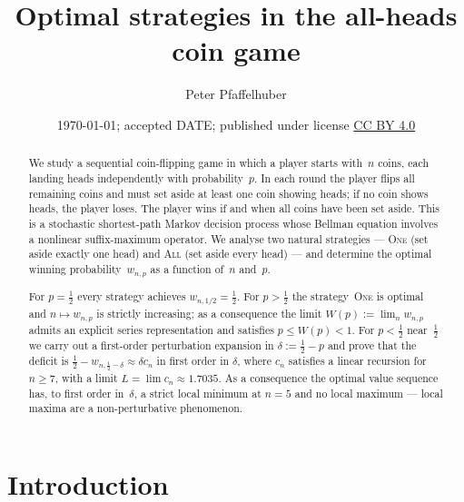\documentclass[reqno,final,11pt]{amsart}
\date{\today; accepted DATE; published under license
\href{https://creativecommons.org/licenses/by/4.0/}{\textup{CC BY 4.0}}}
\theoremstyle{plain}
\theoremstyle{definition}
\theoremstyle{remark}
\newcommand{\One}{\textsc{One}}
\newcommand{\All}{\textsc{All}}
\begin{document}
\title[Optimal strategies in the all-heads coin game]%
      {Optimal strategies in the all-heads coin game}

\author{Peter Pfaffelhuber}
\address{Albert-Ludwigs-Universit\"at Freiburg,
  Ernst-Zermelo-Str.~1, 79104 Freiburg, Germany}


\begin{abstract}
  We study a sequential coin-flipping game in which a player starts
  with~$n$ coins, each landing heads independently with
  probability~$p$.  In each round the player flips all remaining coins
  and must set aside at least one coin showing heads; if no coin shows
  heads, the player loses.  The player wins if and when all coins have
  been set aside.  This is a stochastic shortest-path Markov decision
  process whose Bellman equation involves a nonlinear suffix-maximum
  operator.  We analyse two natural strategies --- \One{} (set aside
  exactly one head) and \All{} (set aside every head) --- and
  determine the optimal winning probability~$w_{n,p}$ as a function
  of~$n$ and~$p$.

  For $p=\tfrac12$ every strategy
  achieves $w_{n,1/2}=\tfrac12$.  For $p>\tfrac12$ the
  strategy~\One{} is optimal and $n\mapsto w_{n,p}$ is strictly
  increasing; as a consequence the limit $W(p):=\lim_n w_{n,p}$
  admits an explicit series representation and satisfies
  $p\le W(p)<1$.  For $p<\tfrac12$ near~$\tfrac12$ we carry out a
  first-order perturbation expansion in $\delta:=\tfrac12-p$ and prove
  that the deficit is 
  $\tfrac12-w_{n,\tfrac 12 - \delta} \approx \delta c_n$ in first order in $\delta$, 
  where $c_n$ satisfies a linear recursion for $n\ge 7$, with
  a limit $L=\lim c_n\approx 1.7035$.  As a consequence the optimal
  value sequence has, to first order in~$\delta$, a strict local
  minimum at $n=5$ and no local maximum --- local maxima are a
  non-perturbative phenomenon.
\end{abstract}

\maketitle

\section{Introduction}\label{sec:intro}
\end{document}
